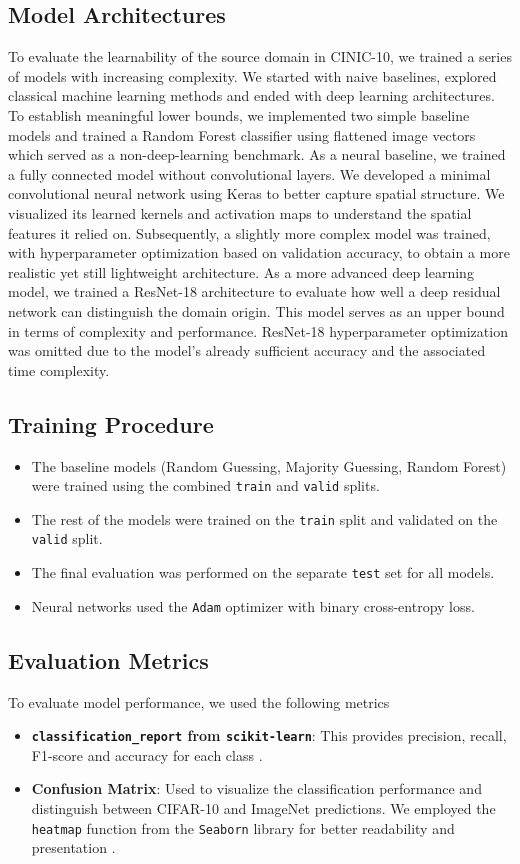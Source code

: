 \subsection{Model Architectures}
To evaluate the learnability of the source domain in CINIC-10, we trained a series of models with increasing complexity. We started with naive 
baselines, explored classical machine learning methods and ended with deep learning architectures.
To establish meaningful lower bounds, we implemented two simple baseline models and trained a Random Forest classifier using flattened image vectors
which served as a non-deep-learning benchmark.
As a neural baseline, we trained a fully connected model without convolutional layers.
We developed a minimal convolutional neural network using Keras to better capture spatial structure.
We visualized its learned kernels and activation maps to understand the spatial features it relied on. 
Subsequently, a slightly more complex model was trained, with hyperparameter optimization based on validation accuracy, 
to obtain a more realistic yet still lightweight architecture.
As a more advanced deep learning model, we trained a ResNet-18 architecture to evaluate how well a deep residual network can distinguish the domain origin.
This model serves as an upper bound in terms of complexity and performance. ResNet-18 hyperparameter optimization was omitted due to the model's already 
sufficient accuracy and the associated time complexity.


\subsection{Training Procedure}
\begin{itemize}
    \item The baseline models (Random Guessing, Majority Guessing, Random Forest) were trained using the combined \texttt{train} and \texttt{valid} splits.
    \item The rest of the models were trained on the \texttt{train} split and validated on the \texttt{valid} split.
    \item The final evaluation was performed on the separate \texttt{test} set for all models.
    \item Neural networks used the \texttt{Adam} optimizer with binary cross-entropy loss.
\end{itemize}

\subsection{Evaluation Metrics}
To evaluate model performance, we used the following metrics
\begin{itemize}
    \item \textbf{\texttt{classification\_report} from \texttt{scikit-learn}}: This provides precision, recall, F1-score and accuracy for each class \cite{scikit-learn}.
    \item \textbf{Confusion Matrix}: Used to visualize the classification performance and distinguish between CIFAR-10 and ImageNet predictions. We 
    employed the \texttt{heatmap} function from the \texttt{Seaborn} library for better readability and presentation \cite{Waskom2021}.
\end{itemize}